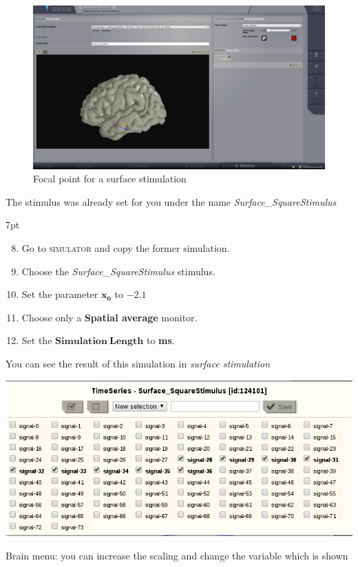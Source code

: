\documentclass{tufte-handout}
\newenvironment{simulation}{%
  \def\FrameCommand{%
    \hspace{1pt}%
    {\color{ForestGreen}\vrule width 2pt}%
    {\color{simulationshade}\vrule width 4pt}%
    \colorbox{simulationshade}%
  }%
  \MakeFramed{\advance\hsize-\width\FrameRestore}%
  \noindent\hspace{-4.55pt}%
  \begin{adjustwidth}{}{7pt}%
  \vspace{2pt}\vspace{2pt}%
}
{%
  \vspace{2pt}\end{adjustwidth}\endMakeFramed%
}
\begin{document}
\begin{figure}[h]
  \includegraphics[width=\linewidth]{Handout_UI_ModellingAnEpilepticPatient_StimulationFocalPoint}%
  \caption{Focal point for a surface stimulation}%
  \label{fig:stim_foc}%
\end{figure}

The stimulus was already set for you under the name \textit{Surface\_SquareStimulus}

  \begin{simulation}
  \begin{enumerate}
  \setcounter{enumi}{7}
  \item Go to \textsc{simulator} and copy the former simulation.
  \item Choose the \textit{Surface\_SquareStimulus} stimulus.
  \item Set the parameter $\mathbf{x_0}$ to $\mathbf{-2.1}$
  \item Choose only a \textbf{Spatial average} monitor.
  \item Set the $\mathbf{Simulation\:Length}$ to \textbf{\unit[4000]{ms}}.
 
\end{enumerate}
\end{simulation}


You can see the result of this simulation in \textit{surface stimulation}

\begin{marginfigure}
  \includegraphics[width=\linewidth]{Handout_UI_ModellingAnEpilepticPatient_ChooseChannelsStimulation}%
  \caption{Brain menu: you can increase the scaling and change the variable which is shown}%
  \label{fig:choose_channels}%
\end{marginfigure}
\end{document}
